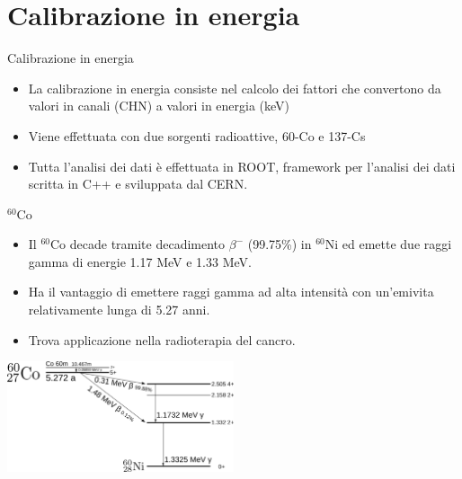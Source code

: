 \documentclass [xcolor=svgnames] {beamer}
\begin{document}
\section{Calibrazione in energia}

\begin{frame}{Calibrazione in energia}
	\begin{itemize}
		\item La calibrazione in energia consiste nel calcolo dei fattori che convertono da valori in canali (CHN) a valori in energia (keV) 
		\item Viene effettuata con due sorgenti radioattive, 60-Co e 137-Cs
		\item Tutta l'analisi dei dati è effettuata in ROOT, framework per l'analisi dei dati scritta in C++ e sviluppata dal CERN.
	\end{itemize}
\end{frame}



\begin{frame}{$^{60}$Co}
	
	
	\begin{itemize}
		\item<1-> Il $^{60}$Co decade tramite decadimento $\beta^{-}$ (99.75\%) in $^{60}$Ni ed emette due raggi gamma di energie 1.17 MeV e 1.33 MeV.
		\item<2-> Ha il vantaggio di emettere raggi gamma ad alta intensità con un'emivita relativamente lunga di 5.27 anni. 
		\item<3-> Trova applicazione nella radioterapia del cancro.
	\end{itemize}
	
	\centering
	\includegraphics[width=0.5\textwidth]{img/Cobalt-60m-decay.png}
	
\end{frame}
\end{document}
